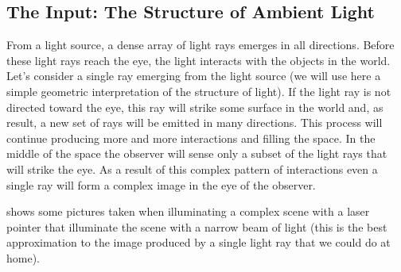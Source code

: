 \subsection{The Input: The Structure of Ambient Light}

From a light source, a dense array of light rays emerges in all directions. Before these light rays reach the eye, the light interacts with the objects in the world. Let's consider a single ray emerging from the light source (we will use here a simple geometric interpretation of the structure of light). If the light ray is not directed toward the eye, this ray will strike some surface in the world and, as result, a new set of rays will be emitted in many directions. This process will continue producing more and more interactions and filling the space. In the middle of the space the observer will sense only a subset of the light rays that will strike the eye. As a result of this complex pattern of interactions even a single ray will form a complex image in the eye of the observer. 

\Fig{\ref{fig:lightRay}} shows some pictures taken when illuminating a complex scene with a laser pointer that illuminate the scene with a narrow beam of light (this is the best approximation to the image produced by a single light ray that we could do at home). 

